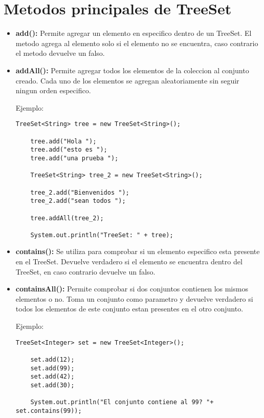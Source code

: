\documentclass[12pt, letterpaper]{article} %
\begin{document}
\section*{Metodos principales de TreeSet}
\begin{itemize}
    \item \textbf{add():} Permite agregar un elemento en especifico dentro de un TreeSet. El metodo agrega al elemento solo si el elemento no se encuentra, caso contrario el metodo devuelve un falso.
    
    \item \textbf{addAll():} Permite agregar todos los elementos de la coleccion al conjunto creado. Cada uno de los elementos se agregan aleatoriamente sin seguir ningun orden especifico.
    
    Ejemplo:
    \lstset{language = Java, breaklines=true, basicstyle=\footnotesize}
    \begin{lstlisting}[frame=single]
    TreeSet<String> tree = new TreeSet<String>();

    tree.add("Hola ");
    tree.add("esto es ");
    tree.add("una prueba ");

    TreeSet<String> tree_2 = new TreeSet<String>();

    tree_2.add("Bienvenidos ");
    tree_2.add("sean todos ");

    tree.addAll(tree_2);

    System.out.println("TreeSet: " + tree);
    \end{lstlisting}

    \item \textbf{contains():} Se utiliza para comprobar si un elemento especifico esta presente en el TreeSet. Devuelve verdadero si el elemento se encuentra dentro del TreeSet, en caso contrario devuelve un falso.

    \item \textbf{containsAll():} Permite comprobar si dos conjuntos contienen los mismos elementos o no. Toma un conjunto como parametro y devuelve verdadero si todos los elementos de este conjunto estan presentes en el otro conjunto.
    
    Ejemplo:
    \lstset{language = Java, breaklines=true, basicstyle=\footnotesize}
    \begin{lstlisting}[frame=single]
    TreeSet<Integer> set = new TreeSet<Integer>();

    set.add(12);
    set.add(99);
    set.add(42);
    set.add(30);

    System.out.println("El conjunto contiene al 99? "+ set.contains(99));


\end{lstlisting}
\end{itemize}
\end{document}
